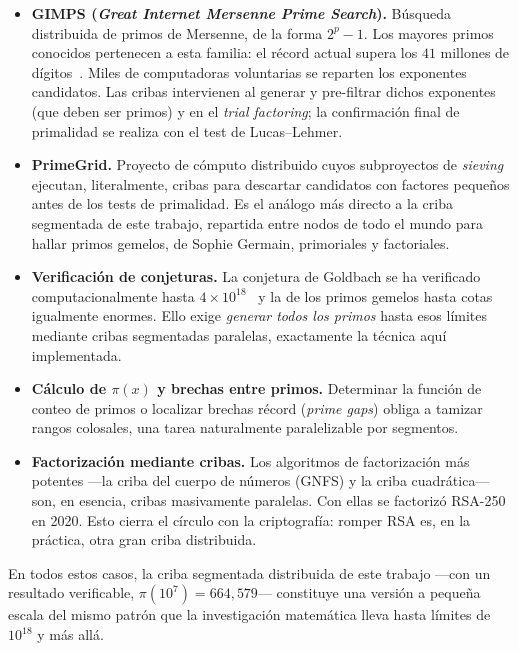 \documentclass[conference]{IEEEtran}
\begin{document}
\begin{itemize}
  \item \textbf{GIMPS (\textit{Great Internet Mersenne Prime Search}).} Búsqueda
        distribuida de primos de Mersenne, de la forma $2^p - 1$. Los mayores
        primos conocidos pertenecen a esta familia: el récord actual supera los
        $41$ millones de dígitos~\cite{gimps}. Miles de computadoras voluntarias
        se reparten los exponentes candidatos. Las cribas intervienen al generar
        y pre-filtrar dichos exponentes (que deben ser primos) y en el
        \textit{trial factoring}; la confirmación final de primalidad se realiza
        con el test de Lucas--Lehmer.
  \item \textbf{PrimeGrid.} Proyecto de cómputo distribuido cuyos subproyectos de
        \textit{sieving} ejecutan, literalmente, cribas para descartar candidatos
        con factores pequeños antes de los tests de primalidad. Es el análogo más
        directo a la criba segmentada de este trabajo, repartida entre nodos de
        todo el mundo para hallar primos gemelos, de Sophie Germain, primoriales
        y factoriales.
  \item \textbf{Verificación de conjeturas.} La conjetura de Goldbach se ha
        verificado computacionalmente hasta $4\times10^{18}$~\cite{oliveira2014}
        y la de los primos gemelos hasta cotas igualmente enormes. Ello exige
        \emph{generar todos los primos} hasta esos límites mediante cribas
        segmentadas paralelas, exactamente la técnica aquí implementada.
  \item \textbf{Cálculo de $\pi(x)$ y brechas entre primos.} Determinar la
        función de conteo de primos o localizar brechas récord (\textit{prime
        gaps}) obliga a tamizar rangos colosales, una tarea naturalmente
        paralelizable por segmentos.
  \item \textbf{Factorización mediante cribas.} Los algoritmos de factorización
        más potentes —la criba del cuerpo de números (GNFS) y la criba
        cuadrática— son, en esencia, cribas masivamente paralelas. Con ellas se
        factorizó RSA-250 en 2020. Esto cierra el círculo con la criptografía:
        romper RSA es, en la práctica, otra gran criba distribuida.
\end{itemize}

En todos estos casos, la criba segmentada distribuida de este trabajo —con un
resultado verificable, $\pi(10^7)=664{,}579$— constituye una versión a pequeña
escala del mismo patrón que la investigación matemática lleva hasta límites de
$10^{18}$ y más allá.
\end{document}
